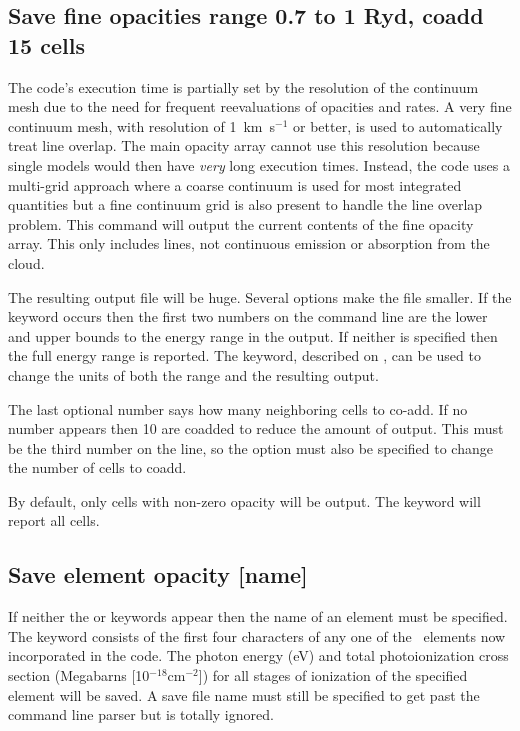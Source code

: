 \subsection{Save fine opacities range 0.7 to 1 Ryd, coadd 15 cells}

The code's execution time is partially set by the resolution of the
continuum mesh due to the need for frequent reevaluations of opacities and
rates.
A very fine continuum mesh, with resolution of 1~km~s$^{-1}$ or better,
is used to automatically treat line overlap.
The main opacity array cannot
use this resolution because single models would then have \emph{very} long execution
times.
Instead, the code uses a multi-grid approach where a coarse continuum
is used for most integrated quantities but a fine continuum grid is also
present to handle the line overlap problem.  This command will output the
current contents of the fine opacity array.  This only includes lines, not
continuous
emission or absorption from the cloud.

The resulting output file
will be huge.  Several options make the file smaller.
If the keyword  occurs then the first two numbers on
the command line are the lower and upper bounds to the energy range in the
output.  If neither is specified then the full energy range is reported.
The  keyword, described on \pageref{output_units},
can be used to change the units of both the range and the resulting output.

The last optional number says how many neighboring cells to co-add.  If
no number appears then 10 are coadded to reduce the amount of output.
This must be the third number on the line, so the  option
must also be specified to change the number of cells to coadd.

By default, only cells with non-zero opacity will be output.  
The keyword  will report all cells.

\subsection{Save element opacity [name]}

If neither the  or  keywords appear then the name of an element must be specified.
The keyword consists of the first four characters of
any one of the \LIMELM\ elements now incorporated in the code.
The photon energy
(eV) and total photoionization cross section (Megabarns [10$^{-18}
\mathrm{cm}^{-2}$]) for
all stages of ionization of the specified element will be saved.
A save
file name must still be specified to get past the command line parser but
is totally ignored.

